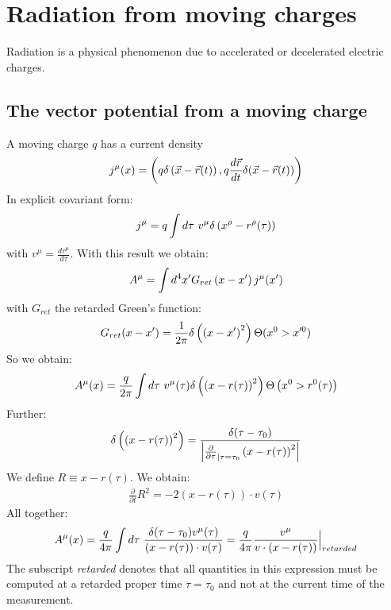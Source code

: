 \section{Radiation from moving charges}

Radiation is a physical phenomenon due to accelerated or decelerated electric
charges.

\subsection{The vector potential from a moving charge}

A moving charge $q$ has a current density
\begin{align*}
    j^\mu (x) = \left( q \delta \left( \vec{x} - \vec{r}(t) \right) , q \frac{d \vec{r}}{dt} \delta(\vec{x} - \vec{r}(t)) \right)
\end{align*}
In explicit covariant form:
\begin{align*}
    j^\mu = q \int d \tau \ v^\mu \delta \left( x^\rho - r^\rho (\tau) \right)
\end{align*}
with $v^\mu = \frac{d r^{\mu}}{d \tau}$. With this result we obtain:
\begin{align*}
    A^\mu = \int d^4 x' G_{ret} \left( x-x' \right) j^\mu (x')
\end{align*}
with $G_{ret}$ the retarded Green's function:
\begin{align*}
    G_{ret} (x-x') = \frac{1}{2 \pi} \delta \left( \left( x-x' \right)^2 \right) \Theta(x^0 > x'^0)
\end{align*}
So we obtain:
\begin{align*}
    A^\mu (x) = \frac{q}{2 \pi} \int d \tau \ v^\mu (\tau) \delta \left( \left( x - r(\tau) \right)^2 \right) \Theta \left( x^0 > r^0 (\tau) \right)
\end{align*}
Further:
\begin{align*}
    \delta \left( \left( x - r(\tau) \right)^2 \right) = \frac{\delta(\tau - \tau_0)}{\left\vert \frac{\partial}{\partial \tau}_{| \tau = \tau_0} \left( x - r(\tau) \right)^2  \right\vert}
\end{align*}
We define $R \equiv x - r(\tau)$. We obtain:
\begin{align*}
    \frac{\partial}{\partial t} R^2 = - 2 (x-r(\tau)) \cdot v(\tau)
\end{align*}
All together:
\begin{align*}
    A^\mu (x) = \frac{q}{4 \pi} \int d \tau \ \frac{\delta(\tau-\tau_0) v^\mu (\tau)}{\left( x - r(\tau) \right) \cdot v(\tau)}
    = \frac{q}{4 \pi} \frac{v^\mu}{v \cdot \left( x - r(\tau) \right)} \Big|_{retarded}
\end{align*}
The subscript \textit{retarded} denotes that all quantities in this expression
must be computed at a retarded proper time $\tau = \tau_0$ and not at the current
time of the measurement.

